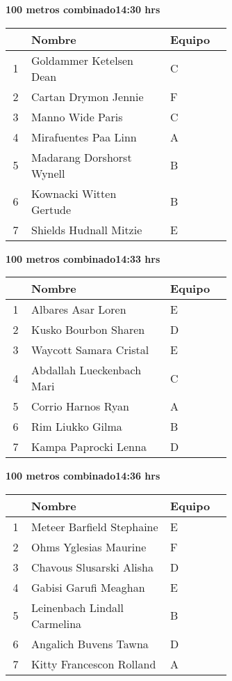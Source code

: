 \begin{minipage}{0.95\linewidth}
\begin{center}
\textbf{
100 metros combinado\hspace{1cm}14:30 hrs}
\end{center}
\begin{tabular}{cp{0.63\linewidth}l}
\hline
& \textbf{Nombre} & \textbf{Equipo} \\ \hline
1 & Goldammer Ketelsen Dean & C \\ 
2 & Cartan Drymon Jennie & F \\ 
3 & Manno Wide Paris & C \\ 
4 & Mirafuentes Paa Linn & A \\ 
5 & Madarang Dorshorst Wynell & B \\ 
6 & Kownacki Witten Gertude & B \\ 
7 & Shields Hudnall Mitzie & E \\ 
\end{tabular}
\end{minipage}
\begin{minipage}{0.95\linewidth}
\begin{center}
\textbf{
100 metros combinado\hspace{1cm}14:33 hrs}
\end{center}
\begin{tabular}{cp{0.63\linewidth}l}
\hline
& \textbf{Nombre} & \textbf{Equipo} \\ \hline
1 & Albares Asar Loren & E \\ 
2 & Kusko Bourbon Sharen & D \\ 
3 & Waycott Samara Cristal & E \\ 
4 & Abdallah Lueckenbach Mari & C \\ 
5 & Corrio Harnos Ryan & A \\ 
6 & Rim Liukko Gilma & B \\ 
7 & Kampa Paprocki Lenna & D \\ 
\end{tabular}
\end{minipage}
\begin{minipage}{0.95\linewidth}
\begin{center}
\textbf{
100 metros combinado\hspace{1cm}14:36 hrs}
\end{center}
\begin{tabular}{cp{0.63\linewidth}l}
\hline
& \textbf{Nombre} & \textbf{Equipo} \\ \hline
1 & Meteer Barfield Stephaine & E \\ 
2 & Ohms Yglesias Maurine & F \\ 
3 & Chavous Slusarski Alisha & D \\ 
4 & Gabisi Garufi Meaghan & E \\ 
5 & Leinenbach Lindall Carmelina & B \\ 
6 & Angalich Buvens Tawna & D \\ 
7 & Kitty Francescon Rolland & A \\ 
\end{tabular}
\end{minipage}
